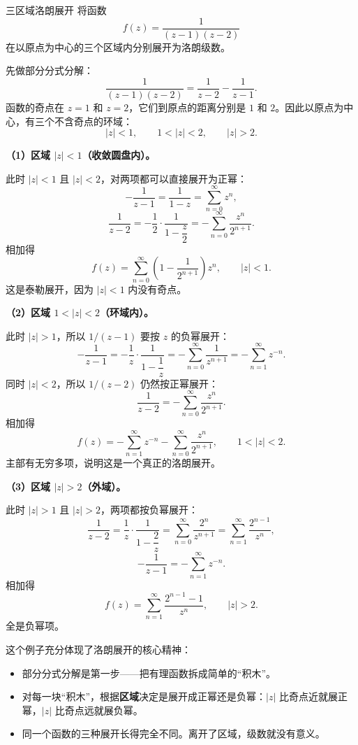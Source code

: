 \begin{lizi}{三区域洛朗展开}{}
将函数
\[
    f(z) = \frac{1}{(z-1)(z-2)}
\]
在以原点为中心的三个区域内分别展开为洛朗级数。

\begin{jie}
先做部分分式分解：
\[
    \frac{1}{(z-1)(z-2)} = \frac{1}{z-2} - \frac{1}{z-1}.
\]
函数的奇点在 $z=1$ 和 $z=2$，它们到原点的距离分别是 $1$ 和 $2$。因此以原点为中心，有三个不含奇点的环域：
\[
    |z|<1, \qquad 1<|z|<2, \qquad |z|>2.
\]

\textbf{（1）区域 $|z|<1$（收敛圆盘内）。}

此时 $|z|<1$ 且 $|z|<2$，对两项都可以直接展开为正幂：
\[
    -\frac{1}{z-1} = \frac{1}{1-z} = \sum_{n=0}^{\infty} z^n,
\]
\[
    \frac{1}{z-2} = -\frac{1}{2}\cdot\frac{1}{1-\dfrac{z}{2}} = -\sum_{n=0}^{\infty} \frac{z^n}{2^{n+1}}.
\]
相加得
\[
    f(z) = \sum_{n=0}^{\infty} \left(1-\frac{1}{2^{n+1}}\right) z^n, \qquad |z|<1.
\]
这是泰勒展开，因为 $|z|<1$ 内没有奇点。

\pagebreak

\textbf{（2）区域 $1<|z|<2$（环域内）。}

此时 $|z|>1$，所以 $1/(z-1)$ 要按 $z$ 的负幂展开：
\[
    -\frac{1}{z-1} = -\frac{1}{z}\cdot\frac{1}{1-\dfrac{1}{z}} = -\sum_{n=0}^{\infty} \frac{1}{z^{n+1}} = -\sum_{n=1}^{\infty} z^{-n}.
\]
同时 $|z|<2$，所以 $1/(z-2)$ 仍然按正幂展开：
\[
    \frac{1}{z-2} = -\sum_{n=0}^{\infty} \frac{z^n}{2^{n+1}}.
\]
相加得
\[
    f(z) = -\sum_{n=1}^{\infty} z^{-n} - \sum_{n=0}^{\infty} \frac{z^n}{2^{n+1}}, \qquad 1<|z|<2.
\]
主部有无穷多项，说明这是一个真正的洛朗展开。

\textbf{（3）区域 $|z|>2$（外域）。}

此时 $|z|>1$ 且 $|z|>2$，两项都按负幂展开：
\[
    \frac{1}{z-2} = \frac{1}{z}\cdot\frac{1}{1-\dfrac{2}{z}} = \sum_{n=0}^{\infty} \frac{2^n}{z^{n+1}} = \sum_{n=1}^{\infty} \frac{2^{n-1}}{z^n},
\]
\[
    -\frac{1}{z-1} = -\sum_{n=1}^{\infty} z^{-n}.
\]
相加得
\[
    f(z) = \sum_{n=1}^{\infty} \frac{2^{n-1}-1}{z^n}, \qquad |z|>2.
\]
全是负幂项。
\end{jie}
\end{lizi}

\begin{tishi}[三区域展开的要点总结]
这个例子充分体现了洛朗展开的核心精神：
\begin{itemize}
    \item 部分分式分解是第一步——把有理函数拆成简单的``积木''。
    \item 对每一块``积木''，根据\textbf{区域}决定是展开成正幂还是负幂：$|z|$ 比奇点近就展正幂，$|z|$ 比奇点远就展负幂。
    \item 同一个函数的三种展开长得完全不同。离开了区域，级数就没有意义。
\end{itemize}
\end{tishi}

